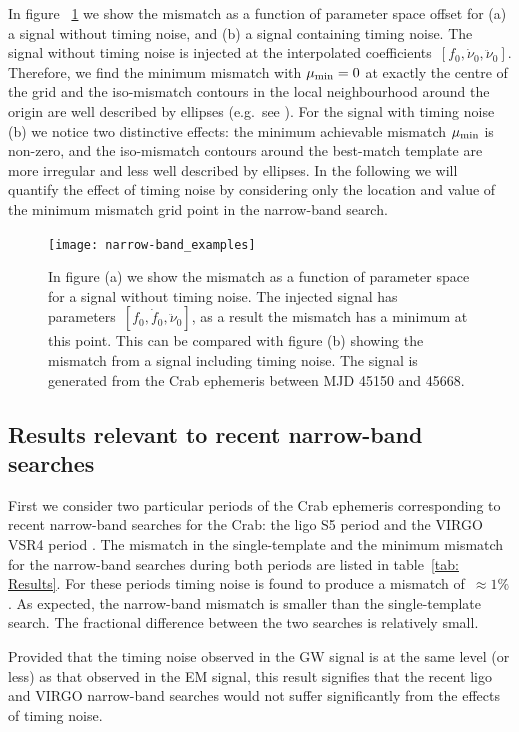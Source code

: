 \documentclass[../full_thesis/full_thesis.tex]{subfiles}
\begin{document}
In figure ~\ref{fig: narrow-band example} we show the mismatch as a function of
parameter space offset for (a) a signal without timing noise, and (b) a signal
containing timing noise. The signal without timing noise is injected at the
interpolated coefficients~$[f_{0}, \dot{\nu}_{0}, \ddot{\nu}_{0}]$.  Therefore, we find
the minimum mismatch with $\mu_{\mathrm{min}}=0$ at exactly the centre of the grid and the
iso-mismatch contours in the local neighbourhood around the origin are well
described by ellipses (e.g.\ see \citet{Prix2007}).  For the signal with timing
noise (b) we notice two distinctive effects: the minimum achievable mismatch
$\mu_{\mathrm{min}}$ is non-zero, and the iso-mismatch contours around the best-match
template are more irregular and less well described by ellipses.  In the
following we will quantify the effect of timing noise by considering only the
location and value of the minimum mismatch grid point in the narrow-band
search.
\begin{figure}[htb]
\centering
\texttt{[image: narrow-band\_examples]}
\caption{In figure (a) we show the mismatch as a function of parameter space
    for a signal without timing noise. The injected signal has
    parameters~$[f_{0}, \dot{f}_{0}, \ddot{\nu}_{0}]$, as a result the mismatch has
    a minimum at this point. This can be compared with figure (b) showing the
mismatch from a signal including timing noise. The signal is generated from the
Crab ephemeris between MJD 45150 and 45668.}
\label{fig: narrow-band example}
\end{figure}


\subsection{Results relevant to recent narrow-band searches}

First we consider two particular periods of the Crab ephemeris corresponding to
recent narrow-band searches for the Crab: the ligo S5 period \citep{ligo2008}
and the VIRGO VSR4 period \citep{ligo2015}. The mismatch in the single-template
and the minimum mismatch for the narrow-band searches during both periods are
listed in table~\ref{tab: Results}. For these periods timing noise is
found to produce a mismatch of~$\approx 1\%$. As expected, the narrow-band
mismatch is smaller than the single-template search. The fractional difference
between the two searches is relatively small.

Provided that the timing noise observed in the GW signal is at the same level
(or less) as that observed in the EM signal, this result signifies that the
recent ligo and VIRGO narrow-band searches would not suffer significantly
from the effects of timing noise.
\end{document}
